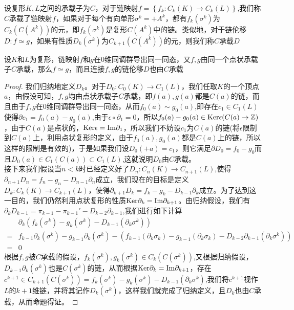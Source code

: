 \begin{definition}
设复形$K,L$之间的承载子为$C$，对于链映射$f=\left\{f_{k}:C_{k}(K)\rightarrow C_{k}(L)\right\}$,我们称$C$承载了链映射$f$，如果对于每个有向单形$\sigma^{k}=+A^{k}$，都有$f_{k}(\sigma^{k})$为$C_{k}(C(A^{k}))$的元，即$f_{k}(\sigma^{k})$是复形$C(A^{k})$中的链。类似地，对于链伦移$D:f\simeq g$，如果有性质$D_{k}(\sigma^{k})$为$C_{k+1}(C(A^{k}))$的元，则我们称$C$承载$D$
\end{definition}
\begin{proposition}[点状承载子定理]
设$K$和$L$为复形，链映射$f$和$g$在$0$维同调群导出同一同态，又$f,g$由同一个点状承载子$C$承载，那么$f\simeq g$，而且连接$f,g$的链伦移$D$也由$C$承载
\end{proposition}
\begin{proof}
我们归纳地定义$D_{k}$。对于$D_{0}:C_{0}(K)\rightarrow C_{1}(L)$，我们任取$K$的一个顶点$a$，由假设可知，$f,g$均由点状承载子$C$承载，即$f(a),g(a)$都是$C(a)$的链，而且由于$f,g$在$0$维同调群导出同一同态，从而$f_{0}(a)\sim g_{0}(a)$,即存在$c_{1}\in C_{1}(L)$使得$\partial c_{1}=f_{0}(a)- g_{0}(a)$,由于$\epsilon\circ \partial_{1}=0$，所以$f_{0}(a)- g_{0}(a)\in {\rm Ker} \epsilon(C(a)\rightarrow \mathbb{Z})$，由于$C(a)$是点状的，${\rm Ker}\epsilon={\rm Im}\partial_{1}$，所以我们不妨设$c_{1}$为$C(a)$的链(将$\epsilon$限制到$C(a)$上，利用点状复形的定义，由于$f_{0}(a),g_{0}(a)$都是$C(a)$上的链，所以这样的限制是有效的)，于是如果我们设$D_{0}(+a)=c_{1}$，则它满足$\partial D_{0}=f_{0}-g_{0}$而且$D_{0}(a)\in C_{1}(C(a))\subset C_{1}(L)$,这就说明$D_{0}$由$C$承载。\\
接下来我们假设当$n<k$时已经定义好了$D_{n}:C_{n}(K)\rightarrow C_{n+1}(L)$,使得$\partial_{n+1}D_{n}=f_{n}-g_{n}-D_{n-1}\partial_{n}$成立，我们现在的目标是定义$D_{k}:C_{k}(K)\rightarrow C_{k+1}(L)$，使得$\partial_{k+1}D_{k}=f_{k}-g_{k}-D_{k-1}\partial_{k}$成立。为了达到这一目的，我们仍然利用点状复形的性质${\rm Ker}\partial_{k}={\rm Im}\partial_{k+1}$。由归纳假设，我们有$\partial_{k}D_{k-1}=\pi_{k-1}-\pi_{k-1}'-D_{k-2}\partial_{k-1}$,我们进行如下计算
\begin{equation*}
\begin{aligned}
    &\partial_{k}(f_{k}(\sigma^{k})-g_{k}(\sigma^{k})-D_{k-1}(\partial_{k}\sigma^{k}))\\
    =&f_{k-1}\partial_{k}(\sigma^{k})-g_{k-1}\partial_{k}(\sigma^{k})-\left(f_{k-1}(\partial_{k}\sigma_{k})-g_{k-1}(\partial_{k}\sigma_{k})-D_{k-2}\partial_{k-1}(\partial_{k}\sigma^{k})\right)\\
    =&0
    \end{aligned}
\end{equation*}
根据$f,g$被$C$承载的假设，$f_{k}(\sigma^{k}),g_{k}(\sigma^{k})\in C_{k}(C(\sigma^{k}))$,又根据归纳假设，$D_{k-1}\partial_{k}(\sigma^{k})$也是$C(\sigma^{k})$的链，从而根据${\rm Ker}\partial_{k}={\rm Im}\partial_{k+1}$，存在$c^{k+1}\in C_{k+1}(C(\sigma^{k}))=f_{k}(\sigma^{k})-g_{k}(\sigma^{k})-D_{k-1}(\partial_{k}\sigma^{k})$,我们将$c^{k+1}$视作$L$的$k+1$维链，并将其记作$D_{k}(\sigma^{k})$，这样我们就完成了归纳定义，且$D_{k}$也由$C$承载，从而命题得证。
\end{proof}
